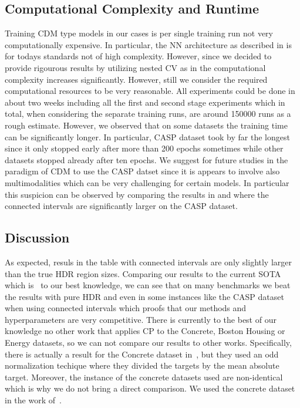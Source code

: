 \subsection{Computational Complexity and Runtime}
Training CDM type models in our cases is per single training run not very computationally expensive. In particular, the NN architecture as described in  is for todays standards not of high complexity. However, since we decided to provide rigourous results by utilizing nested CV as in  the computational complexity increases significantly. However, still we consider the required computational resources to be very reasonable. All experiments could be done in about two weeks including all the first and second stage experiments which in total, when considering the separate training runs, are around 150000 runs as a rough estimate. However, we observed that on some datasets the training time can be significantly longer. In particular, CASP dataset took by far the longest since it only stopped early after more than 200 epochs sometimes while other datasets stopped already after ten epochs. We suggest for future studies in the paradigm of CDM to use the  CASP datset since it is appears to involve also multimodalities which can be very challenging for certain models. In particular this suspicion can be observed by comparing the results in  and  where the connected intervals are significantly larger on the CASP dataset.

\subsection{Discussion}\label{sec:discussion}
As expected, resuls in the table with connected intervals are only slightly larger than the true HDR region sizes. Comparing our results to the current SOTA which is~\cite{sesia2021conformal} to our best knowledge, we can see that on many benchmarks we beat the results with pure HDR and even in some instances like the CASP dataset when using connected intervals which proofs that our methods and hyperparameters are very competitive. There is currently to the best of our knowledge no other work that applies CP to the Concrete, Boston Housing or Energy datasets, so we can not compare our results to other works. Specifically, there is actually a result for the Concrete dataset in~\cite{romano2019conformalized}, but they used an odd normalization techique where they divided the targets by the mean absolute target. Moreover, the instance of the concrete datasets used are non-identical which is why we do not bring a direct comparison. We used the concrete dataset in the work of~\cite{rothfuss2019noise}.

